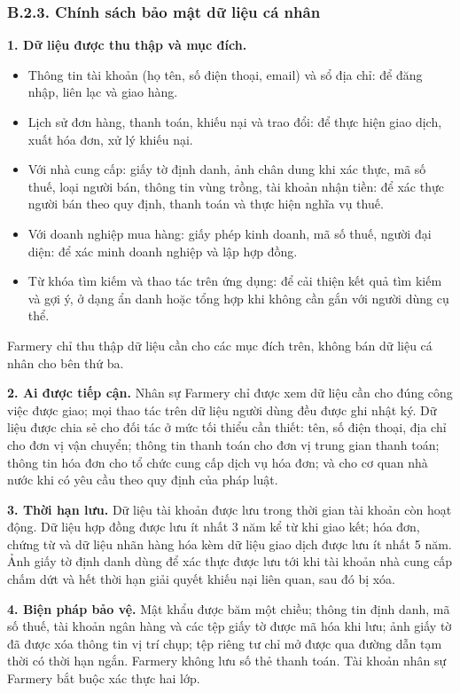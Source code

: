 \subsubsection*{B.2.3. Chính sách bảo mật dữ liệu cá nhân}

\noindent\textbf{1. Dữ liệu được thu thập và mục đích.}
\begin{itemize}
    \item Thông tin tài khoản (họ tên, số điện thoại, email) và sổ địa chỉ:
    để đăng nhập, liên lạc và giao hàng.
    \item Lịch sử đơn hàng, thanh toán, khiếu nại và trao đổi: để thực hiện
    giao dịch, xuất hóa đơn, xử lý khiếu nại.
    \item Với nhà cung cấp: giấy tờ định danh, ảnh chân dung khi xác thực, mã
    số thuế, loại người bán, thông tin vùng trồng, tài khoản nhận tiền: để xác
    thực người bán theo quy định, thanh toán và thực hiện nghĩa vụ thuế.
    \item Với doanh nghiệp mua hàng: giấy phép kinh doanh, mã số thuế, người
    đại diện: để xác minh doanh nghiệp và lập hợp đồng.
    \item Từ khóa tìm kiếm và thao tác trên ứng dụng: để cải thiện kết quả tìm
    kiếm và gợi ý, ở dạng ẩn danh hoặc tổng hợp khi không cần gắn với người
    dùng cụ thể.
\end{itemize}
Farmery chỉ thu thập dữ liệu cần cho các mục đích trên, không bán dữ liệu cá
nhân cho bên thứ ba.

\noindent\textbf{2. Ai được tiếp cận.} Nhân sự Farmery chỉ được xem dữ liệu cần
cho đúng công việc được giao; mọi thao tác trên dữ liệu người dùng đều được
ghi nhật ký. Dữ liệu được chia sẻ cho đối tác ở mức tối thiểu cần thiết: tên,
số điện thoại, địa chỉ cho đơn vị vận chuyển; thông tin thanh toán cho đơn vị
trung gian thanh toán; thông tin hóa đơn cho tổ chức cung cấp dịch vụ hóa
đơn; và cho cơ quan nhà nước khi có yêu cầu theo quy định của pháp luật.

\noindent\textbf{3. Thời hạn lưu.} Dữ liệu tài khoản được lưu trong thời gian
tài khoản còn hoạt động. Dữ liệu hợp đồng được lưu ít nhất 3 năm kể từ khi
giao kết; hóa đơn, chứng từ và dữ liệu nhãn hàng hóa kèm dữ liệu giao dịch
được lưu ít nhất 5 năm. Ảnh giấy tờ định danh dùng để xác thực được lưu tới
khi tài khoản nhà cung cấp chấm dứt và hết thời hạn giải quyết khiếu nại liên
quan, sau đó bị xóa.

\noindent\textbf{4. Biện pháp bảo vệ.} Mật khẩu được băm một chiều; thông tin
định danh, mã số thuế, tài khoản ngân hàng và các tệp giấy tờ được mã hóa khi
lưu; ảnh giấy tờ đã được xóa thông tin vị trí chụp; tệp riêng tư chỉ mở được
qua đường dẫn tạm thời có thời hạn ngắn. Farmery không lưu số thẻ thanh toán.
Tài khoản nhân sự Farmery bắt buộc xác thực hai lớp.

